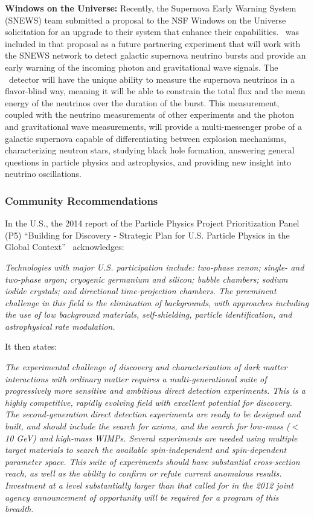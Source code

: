 {\bf Windows on the Universe:}
Recently, the Supernova Early Warning System (SNEWS) team submitted a proposal to the NSF Windows on the Universe solicitation for an upgrade to their system that enhance their capabilities.  \DSks\ was included in that proposal as a future partnering experiment that will work with the SNEWS network to detect galactic supernova neutrino bursts and provide an early warning of the incoming photon and gravitational wave signals.  The \DSks\ detector will have the unique ability to measure the supernova neutrinos in a flavor-blind way, meaning it will be able to constrain the total flux and the mean energy of the neutrinos over the duration of the burst.  This measurement, coupled with the neutrino measurements of other experiments and the photon and gravitational wave measurements, will provide a multi-messenger probe of a galactic supernova capable of differentiating between explosion mechanisms, characterizing neutron stars, studying black hole formation, answering general questions in particle physics and astrophysics, and providing new insight into neutrino oscillations.


\subsubsection{Community Recommendations}

In the U.S., the 2014 report of the Particle Physics Project Prioritization Panel (P5) ``Building for Discovery - Strategic Plan for U.S. Particle Physics in the Global Context''~\cite{ParticlePhysicsProjectPrioritizationPanel:2014td} acknowledges:

{\it Technologies with major U.S. participation include: two-phase xenon; single- and two-phase argon; cryogenic germanium and silicon; bubble chambers; sodium iodide crystals; and directional time-projection chambers. The preeminent challenge in this field is the elimination of backgrounds, with approaches including the use of low background materials, self-shielding, particle identification, and astrophysical rate modulation.}

It then states:

{\it The experimental challenge of discovery and characterization of dark matter interactions with ordinary matter requires a multi-generational suite of progressively more sensitive and ambitious direct detection experiments.  This is a highly competitive, rapidly evolving field with excellent potential for discovery.  The second-generation direct detection experiments are ready to be designed and built, and should include the search for axions, and the search for low-mass ($<$10 GeV) and high-mass WIMPs.  Several experiments are needed using multiple target materials to search the available spin-independent and spin-dependent parameter space.  This suite of experiments should have substantial cross-section reach, as well as the ability to confirm or refute current anomalous results.  Investment at a level substantially larger than that called for in the 2012 joint agency announcement of opportunity will be required for a program of this breadth.}


